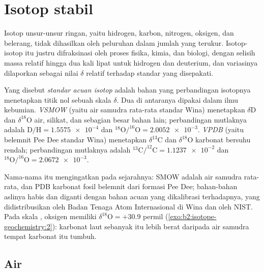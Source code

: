 \section{Isotop stabil}

Isotop unsur-unsur ringan, yaitu hidrogen, karbon, nitrogen, oksigen, dan
belerang, tidak dihasilkan oleh peluruhan dalam jumlah yang terukur. Isotop-isotop itu justru difraksinasi
oleh proses fisika, kimia, dan biologi, dengan selisih massa relatif
hingga dua kali lipat untuk hidrogen dan deuterium, dan
variasinya dilaporkan sebagai nilai $\delta$ relatif terhadap standar yang disepakati.

\begin{definition}\label{def:b2:isotope-geochemistry:standards}
Yang disebut \emph{standar acuan isotop} adalah
bahan yang perbandingan isotopnya menetapkan titik nol sebuah skala $\delta$. Dua di antaranya dipakai
dalam ilmu kebumian. \emph{VSMOW} (yaitu air samudra rata-rata
standar Wina) menetapkan $\delta\mathrm{D}$ dan $\delta^{18}\mathrm{O}$ air, silikat, dan
sebagian besar bahan lain; perbandingan mutlaknya adalah $\mathrm{D}/\mathrm{H} =
\num{1.5575e-4}$ dan $^{18}\mathrm{O}/^{16}\mathrm{O} = \num{2.0052e-3}$.
\emph{VPDB} (yaitu belemnit Pee Dee standar Wina) menetapkan $\delta^{13}\mathrm{C}$
dan $\delta^{18}\mathrm{O}$ karbonat bersuhu rendah; perbandingan mutlaknya
adalah $^{13}\mathrm{C}/^{12}\mathrm{C} = \num{1.1237e-2}$ dan
$^{18}\mathrm{O}/^{16}\mathrm{O} = \num{2.0672e-3}$.
\end{definition}

Nama-nama itu mengingatkan pada sejarahnya: SMOW adalah air samudra rata-rata, dan PDB
karbonat fosil belemnit dari formasi Pee Dee; bahan-bahan
aslinya habis dan diganti dengan bahan acuan yang dikalibrasi terhadapnya,
yang didistribusikan oleh Badan Tenaga Atom Internasional di Wina dan oleh NIST.
Pada skala , oksigen  memiliki $\delta^{18}\mathrm{O} = +30.9$ permil
(\cref{exo:b2:isotope-geochemistry:2}): karbonat laut sebanyak itu lebih berat daripada air samudra tempat karbonat itu
tumbuh.

\subsection{Air}

